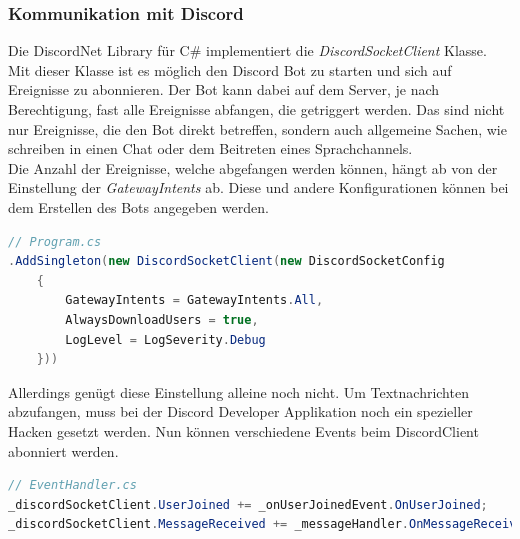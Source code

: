 \documentclass[a4paper, table]{article}
\begin{document}
\subsubsection{Kommunikation mit Discord}
Die DiscordNet Library für C\# implementiert die \textit{DiscordSocketClient} Klasse.
Mit dieser Klasse ist es möglich den Discord Bot zu starten und sich auf Ereignisse zu abonnieren.
Der Bot kann dabei auf dem Server, je nach Berechtigung, fast alle Ereignisse abfangen, die getriggert werden.
Das sind nicht nur Ereignisse, die den Bot direkt betreffen, sondern auch allgemeine Sachen, 
wie schreiben in einen Chat oder dem Beitreten eines Sprachchannels.\\
Die Anzahl der Ereignisse, welche abgefangen werden können, hängt ab von der Einstellung der \textit{GatewayIntents} ab.
Diese und andere Konfigurationen können bei dem Erstellen des Bots angegeben werden.

\begin{lstlisting}[language=csharp]
// Program.cs
.AddSingleton(new DiscordSocketClient(new DiscordSocketConfig
    {
        GatewayIntents = GatewayIntents.All,
        AlwaysDownloadUsers = true,
        LogLevel = LogSeverity.Debug
    }))
\end{lstlisting}

Allerdings genügt diese Einstellung alleine noch nicht.
Um Textnachrichten abzufangen, muss bei der Discord Developer Applikation noch ein spezieller Hacken gesetzt werden.
\newline
Nun können verschiedene Events beim DiscordClient abonniert werden.

\begin{lstlisting}[language=csharp]
// EventHandler.cs
_discordSocketClient.UserJoined += _onUserJoinedEvent.OnUserJoined;
_discordSocketClient.MessageReceived += _messageHandler.OnMessageReceived;
\end{lstlisting}
\end{document}
